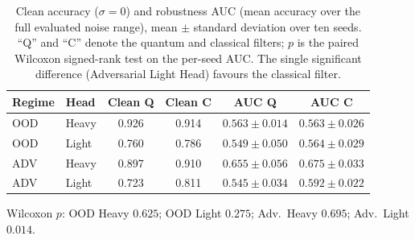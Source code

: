 \begin{table}[tbp]
    \centering
    \caption{Clean accuracy ($\sigma=0$) and robustness AUC (mean accuracy over the full evaluated noise range), mean $\pm$ standard deviation over ten seeds. ``Q'' and ``C'' denote the quantum and classical filters; $p$ is the paired Wilcoxon signed-rank test on the per-seed AUC. The single significant difference (Adversarial Light Head) favours the classical filter.}
    \label{tab:exp4_auc}
    \setlength{\tabcolsep}{4pt}
    \footnotesize
    \begin{tabular}{llcccc}
        \toprule
        Regime & Head  & Clean Q & Clean C & AUC Q             & AUC C                      \\
        \midrule
        OOD    & Heavy & 0.926   & 0.914   & $0.563 \pm 0.014$ & $0.563 \pm 0.026$          \\
        OOD    & Light & 0.760   & 0.786   & $0.549 \pm 0.050$ & $0.564 \pm 0.029$          \\
        ADV    & Heavy & 0.897   & 0.910   & $0.655 \pm 0.056$ & $0.675 \pm 0.033$          \\
        ADV    & Light & 0.723   & 0.811   & $0.545 \pm 0.034$ & $\mathbf{0.592 \pm 0.022}$ \\
        \bottomrule
    \end{tabular}

    \vspace{0.5em}
    {\footnotesize Wilcoxon $p$: OOD Heavy $0.625$; OOD Light $0.275$; Adv.\ Heavy $0.695$; Adv.\ Light $\mathbf{0.014}$.}
\end{table}

